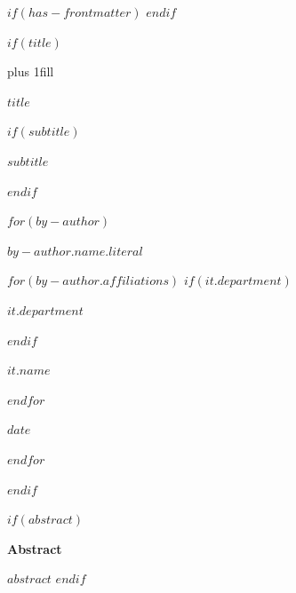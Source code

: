 $if(has-frontmatter)$
\frontmatter
$endif$

$if(title)$
    \cleardoublepage
    \thispagestyle{empty}

    {\centering \hbox{}\vskip 0cm plus 1fill

    {\huge\bfseries $title$ \par}
    $if(subtitle)$
    \vspace{3ex}
    {\large\bfseries $subtitle$ \par}
    $endif$

    \vspace{10ex}

    $for(by-author)$
        {\large\bfseries $by-author.name.literal$ \par}
        \vspace{3ex}
        \vspace{10ex}
            $for(by-author.affiliations)$%
                $if(it.department)$%
                    {\bfseries\small $it.department$ \par}
                    \vspace{3ex}
                $endif$%
                {\bfseries\small $it.name$ \par}
            $endfor$
        \vspace{3ex}
        {\bfseries\small $date$ \par}
    $endfor$

    \vspace{30ex}
    }
$endif$

$if(abstract)$
    \cleardoublepage
    \thispagestyle{empty}
    \begin{center}
        {\bfseries\large Abstract}
    \end{center}
    \vspace{3ex}
    $abstract$
    \vspace{10ex}
$endif$

